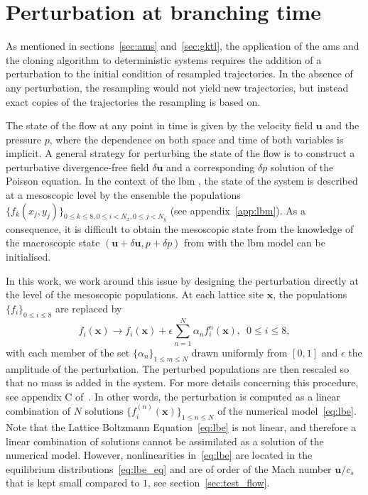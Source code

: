 \section{Perturbation at branching time}
\label{app:perturb_branching_time}
As mentioned in sections~\ref{sec:ams} and~\ref{sec:gktl}, the application of the \ac{ams} and the cloning algorithm to deterministic systems requires the addition of a perturbation to the initial condition of
resampled trajectories.
In the absence of any perturbation, the resampling would not yield new trajectories, but instead exact copies of the trajectories the resampling is based on.

The state of the flow at any point in time is given by the velocity field $\mathbf{u}$ and the pressure $p$, where the dependence on both space and time of both variables is implicit.
A general strategy for perturbing the state of the flow is to construct a perturbative divergence-free field $\delta \mathbf{u}$ and a corresponding $\delta p$ solution of the
Poisson equation.
In the context of the \ac{lbm} , the state of the system is described at a mesoscopic level by the ensemble the populations $\{f_k(x_j, y_j)\}_{0\le k \le 8, 0 \le i <N_x, 0 \le j < N_y}$ (see appendix~\ref{app:lbm}).
As a consequence, it is difficult to obtain the mesoscopic state from the knowledge of the macroscopic state $(\mathbf{u}+\delta \mathbf{u}, p + \delta p)$ from with the \ac{lbm} model can be initialised.

In this work, we work around this issue by designing the perturbation directly at the level of the mesoscopic populations.
At each lattice site $\mathbf{x}$, the populations $\{f_i\}_{0\le i \le 8}$ are replaced by
\begin{equation}
  f_{i}(\mathbf{x}) \longrightarrow f_i(\mathbf{x}) + \epsilon \sum_{n=1}^{N} \alpha_{n}f_{i}^{n}(\mathbf{x}), \,\,\, 0\leq i \leq 8,
  \label{eq:perturb_pop}
\end{equation}
with each member of the set $\{\alpha_n\}_{1\leq m \leq N}$ drawn uniformly from $[0,1]$ and $\epsilon$ the amplitude of the perturbation. The perturbed populations are then rescaled so that no mass is added in the system.
For more details concerning this procedure, see appendix C of~\cite{lestang:tel-01974316}.
In other words, the perturbation is computed as a linear combination of $N$ solutions $\{f_i^{(n)}(\mathbf{x})\}_{1\le n \le N}$ of the numerical model~\eqref{eq:lbe}.
Note that the Lattice Boltzmann Equation~\eqref{eq:lbe} is not linear, and therefore a linear combination of solutions cannot be assimilated as a solution of the numerical model.
However, nonlinearities in~\eqref{eq:lbe} are located in the equilibrium distributions~\eqref{eq:lbe_eq} and are of order of the Mach number $\mathbf{u}/c_s$ that is kept small compared to $1$, see section~\ref{sec:test_flow}.

